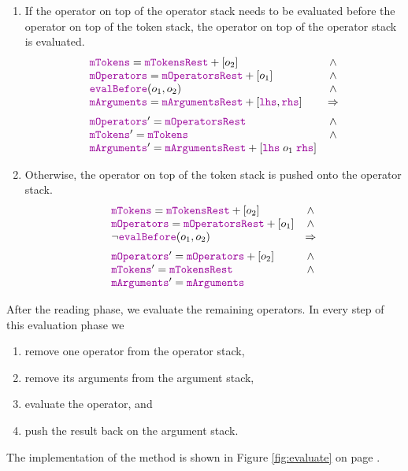 \begin{enumerate}
      In the remaining cases neither the token on top of the token stack nor the operator on top of the
      operator stack can be a parenthesis.  The following rules will implicitly assume that this is the case.
\item If the operator on top of the operator stack needs to be evaluated before the operator on top of the token stack,
      the operator on top of the operator stack is evaluated.
    $$\begin{array}{lc}
        \mytt{mTokens} = \mytt{mTokensRest} + [o_2]                                        & \wedge \\
        \mytt{mOperators} = \mytt{mOperatorsRest} + [o_1]                                  & \wedge \\
        \mytt{evalBefore}(o_1, o_2)                                                          & \wedge \\ 
        \mytt{mArguments} = \mytt{mArgumentsRest} + [\mytt{lhs}, \mytt{rhs}]           & \Rightarrow \\[0.2cm]
        \mytt{mOperators}' = \mytt{mOperatorsRest}                                         & \wedge \\
        \mytt{mTokens}' = \mytt{mTokens}                                                   & \wedge \\
        \mytt{mArguments}' = \mytt{mArgumentsRest} + [\mytt{lhs} \;o_1\; \mytt{rhs}]
        \end{array} 
      $$
\item Otherwise, the operator on top of the token stack is pushed onto the operator stack.
     $$\begin{array}{lc}
         \mytt{mTokens} = \mytt{mTokensRest} + [o_2]           & \wedge \\
         \mytt{mOperators} = \mytt{mOperatorsRest} + [o_1]     & \wedge \\
         \neg \mytt{evalBefore}(o_1, o_2)                        & \Rightarrow \\[0.2cm]
        \mytt{mOperators}' = \mytt{mOperators} + [o_2]         & \wedge \\
        \mytt{mTokens}' = \mytt{mTokensRest}                   & \wedge \\
        \mytt{mArguments}' = \mytt{mArguments}
        \end{array} 
      $$
\end{enumerate}
After the reading phase, we evaluate the remaining operators.  In every step of this evaluation phase we   
\begin{enumerate}
\item remove one operator from the operator stack, 
\item remove its arguments from the argument stack, 
\item evaluate the operator, and 
\item push the result back on the argument stack. 
\end{enumerate}
The implementation of the method  is shown in Figure \ref{fig:evaluate} on page \pageref{fig:evaluate}.

